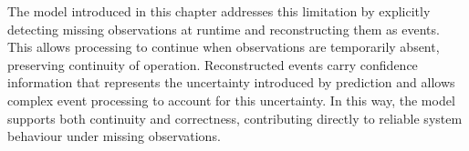 The model introduced in this chapter addresses this limitation by explicitly detecting missing observations at runtime and reconstructing them as events. This allows processing to continue when observations are temporarily absent, preserving continuity of operation. Reconstructed events carry confidence information that represents the uncertainty introduced by prediction and allows complex event processing to account for this uncertainty. In this way, the model supports both continuity and correctness, contributing directly to reliable system behaviour under missing observations.